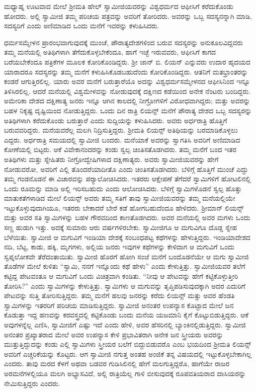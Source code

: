  ಮಧ್ಯಾಹ್ನ ಊಟವಾದ ಮೇಲೆ ಶ‍್ರೀಮತಿ ಹೇಲ್ ಸ್ವಾಮೀಜಿಯವರನ್ನು ವಿಶ್ವಧರ್ಮದ ಆಫೀಸಿಗೆ ಕರೆದುಕೊಂಡು ಹೋದರು. ಅಲ್ಲಿ ಸ್ವಾಮೀಜಿ ತಮ್ಮ ಪರಿಚಯ ಪತ್ರವನ್ನು ಅವರಿಗೆ ತೋರಿದರು. ಅವರನ್ನು ಒಬ್ಬ ಸದಸ್ಯನನ್ನಾಗಿ ಮಾಡಿ, ಸದಸ್ಯರಿಗೆ ಎಂದು ಅಣಿಮಾಡಿದ ಒಂದು ಮನೆಗೆ ಇವರನ್ನು ಕಳುಹಿಸಿದರು. 

 ಧರ್ಮಸಮ್ಮೇಳನ ಪ್ರಾರಂಭವಾಗುವುದಕ್ಕೆ ಮುಂಚೆ, ಪೌರಾತ್ಯದೇಶಗಳಿಂದ ಬರುವ ಸದಸ್ಯರನ್ನು ಅನುಕೂಲವಿದ್ದವರು ತಮ್ಮ ಮನೆಯಲ್ಲಿ ಅತಿಥಿಗಳಾಗಿ ತೆಗೆದುಕೊಳ್ಳಬೇಕೆಂದೂ, ಹಾಗೆ ಇಚ್ಛೆ ಇರುವವರು, ಆಫೀಸಿಗೆ ಕಾಗದ ಬರೆಯಬೇಕೆಂದೂ ಪತ್ರಿಕೆಗಳ ಮೂಲಕ ಕೋರಿಕೊಂಡಿದ್ದರು. ಶ‍್ರೀ ಜಾನ್ ಬಿ. ಲಿಯನ್ ಎನ್ನುವರು ಉದಾರ ಹೃದಯದ ಯಾರಾದರೂ ಸದಸ್ಯರನ್ನು ತಮ್ಮ ಮನೆಗೆ ಕಳುಹಿಸಿಕೊಡಬಹುದೆಂದು ಕೋರಿಕೊಂಡಿದ್ದರು. ಆತನಿಗೆ ಮತಭ್ರಾಂತರನ್ನು ಕಂಡರೆ ಆಗುತ್ತಿರಲಿಲ್ಲ. ಯಾರು ಅವರ ಮನೆಗೆ ಬರುತ್ತಾರೆಯೊ ಅದನ್ನು ವಿಶ್ವಧರ್ಮಸಮ್ಮೇಳನದ ಆಫೀಸಿನಿಂದ ಇನ್ನೂ ತಿಳಿಸಿರಲಿಲ್ಲ. ಆದರೆ ಮನೆಯಲ್ಲಿ ವಿಶ್ವಮೇಳವನ್ನು ನೋಡುವುದಕ್ಕೆ ದಕ್ಷಿಣದ ಕಡೆಯಿಂದ ಅನೇಕ ನೆಂಟರು ಬಂದಿದ್ದರು. ಅಮೇರಿಕಾ ದೇಶದ ದಕ್ಷಿಣಾತ್ಯ ಜನರು ಇನ್ನೂ ಆಗಿನ ಕಾಲದಲ್ಲಿ ನೀಗ್ರೋಗಳಿಗೆ ವಿರೋಧವಾಗಿದ್ದರು; ಮತ್ತು ಅವರನ್ನು ಬಹಳ ನಿಕೃಷ್ಟ ದೃಷ್ಟಿಯಿಂದ ನೋಡುತ್ತಿದ್ದರು. ಒಂದು ದಿನ ರಾತ್ರಿ ಲಿಯನ್ಸ್ ಮನೆಗೆ ಪೌರಾತ್ಯ ದೇಶದ ಒಬ್ಬ ಸದಸ್ಯರನ್ನು ಅತಿಥಿಗಳಾಗಿ ಕರೆದುಕೊಂಡು ಬರುತ್ತಾರೆ ಎಂದು ಸುದ್ದಿಯನ್ನು ಕಳುಹಿಸಿದರು. ಅವರು ಅರ್ಧರಾತ್ರಿ ಹೊತ್ತಿಗೆ ಬರುವವರಿದ್ದರು. ಮನೆಯವರೆಲ್ಲ ಮಲಗಿ ನಿದ್ರಿಸುತ್ತಿದ್ದರು. ಶ‍್ರೀಮತಿ ಲಿಯನ್ಸ್ ಅತಿಥಿಯನ್ನು ಬರಮಾಡಿಕೊಳ್ಳಲು ಎದ್ದರು. ಅರ್ಧರಾತ್ರಿ ಸಮಯದಲ್ಲಿ ಸ್ವಾಮೀಜಿ ಬಂದರು. ಮನೆಯಾಕೆ ಅವರನ್ನು ಸ್ವಾಗತಿಸಿ ಅವರಿಗೆ ಅಣಿಮಾಡಿದ ಕೋಣೆಯಲ್ಲಿ ಬಿಟ್ಟರು. ಆಕೆ ವಿವೇಕಾನಂದರನ್ನು ಕಂಡು ಸ್ವಲ್ಪ ಚಿಂತಿಸತೊಡಗಿದರು. ತಮ್ಮ ಮನೆಗೆ ಬಂದ ಇತರ ಅತಿಥಿಗಳು ಮತ್ತು ಸ್ನೇಹಿತರು ನೀಗ್ರೋದ್ವೇಷಿಗಳಾದ ದಕ್ಷಿಣಾತ್ಯರು. ಅವರು ಸ್ವಾಮೀಜಿಯವರನ್ನು ಹೇಗೆ ನೋಡುವರೋ, ಅವರಿಗೆ ಎಲ್ಲಿ ತೊಂದರೆಯಾದೀತೊ ಎಂದು ಚಿಂತಿಸತೊಡಗಿದರು. ಬೆಳಿಗ್ಗೆ ಹೊತ್ತಿಗೆ ಮುಂಚೆ ಎದ್ದು ತಮ್ಮ ಗಂಡನೊಡನೆ ಈ ವಿಚಾರವನ್ನು ಪರ‍್ಯಾಲೋಚಿಸಿದರು. ಇತರರು ಆಕ್ಷೇಪಣೆ ತೆಗೆದರೆ ಸ್ವಾಮಿಗಳಿಗೆ ಹೋಟಲಿನಲ್ಲಿ ಒಂದು ರೂಮನ್ನು ಮಾಡಿ ಅಲ್ಲಿ ಇರಿಸಬಹುದು ಎಂದು ಆಲೋಚಿಸಿದರು. ಬೆಳಿಗ್ಗೆ ಸ್ವಾಮಿಗಳೊಡನೆ ಸ್ವಲ್ಪ ಹೊತ್ತು ಮಾತುಕತೆಗಳಾಡಿದ ಮೇಲೆ ಲಿಯನ್ಸ್ ಅವರು ತಮ್ಮ ಸತಿಗೆ ತಾವು ಸ್ವಾಮೀಜಿಯವರನ್ನು ತಮ್ಮ ಮನೆಯಲ್ಲಿಯೇ ಇಟ್ಟುಕೊಳ್ಳುವುದಾಗಿಯೂ, ಇತರರು ಬೇಕಾದರೆ ಬೇರೆ ಕಡೆ ಹೋಗಬಹುದೆಂದೂ ಹೇಳಿದರು. ಶ‍್ರೀಮಾನ್ ಲಿಯನ್ಸ್ ಮತ್ತು ಅವರ ಸತಿ ಸ್ವಾಮಿಗಳನ್ನು ಬಹಳ ಗೌರವದಿಂದ ಕಾಣತೊಡಗಿದರು. ಅವರ ಮನೆಯಲ್ಲಿ ಅವರ ಮಗಳು ಒಂದು ಸಣ್ಣ ಹುಡುಗಿ ಇತ್ತು. ಅದಕ್ಕೆ ಸುಮಾರು ಆರು ವರ್ಷಗಳಿರಬೇಕು. ಸ್ವಾಮೀಜಿಗೂ ಆ ಮಗುವಿಗೂ ದೊಡ್ಡ ಸ್ನೇಹ ಬೆಳೆಯಿತು. ಸ್ವಾಮೀಜಿ ಆ ಮಗುವಿಗೆ ಇಂಡಿಯಾ ದೇಶಕ್ಕೆ ಸಂಬಂಧಪಟ್ಟ ಕಥೆಗಳನ್ನು ಹೇಳುತ್ತಿದ್ದರು. ಇಂಡಿಯಾದೇಶದ ನದಿ, ಬೆಟ್ಟ, ಕಾಡು, ಹಕ್ಕಿ, ಮೃಗಗಳು, ಅಲ್ಲಿಯ ಜನರು ಇವುಗಳ ಕಥೆಗಳನ್ನು ಕೇಳಿದಾಗ ಆ ಮಗುವಿಗೆ ಒಂದು ಸ್ವಪ್ನಲೋಕವೇ ತೆರೆದಂತಾಯಿತು. ಸ್ವಾಮೀಜಿ ಹೊರಗೆ ಹೋಗಿ ಸಂಜೆ ಮನೆಗೆ ಬಂದೊಡನೆಯೇ ಆ ಮಗು ಸ್ವಾಮೀಜಿ ತೊಡೆಗಳ ಮೇಲೆ ಕುಳಿತು “ಸ್ವಾಮಿ, ನನಗೆ ಇನ್ನೊಂದು ಕಥೆ ಹೇಳು” ಎಂದು ಕೇಳುತ್ತಿತ್ತು. ಸ್ವಾಮೀಜಿಯವರ ತಲೆಗೆ ಕಟ್ಟಿದ್ದ ಪೇಟವಂತೂ ಆ ಮಗುವಿಗೆ ಒಂದು ವಿಚಿತ್ರವಾಗಿ ಕಂಡಿತು. “ನೀವು ಆ ಪೇಟವನ್ನು ಹೇಗೆ ಕಟ್ಟಿಕೊಳ್ಳುತ್ತೀರಿ ತೋರಿಸಿ?” ಎಂದು ಸ್ವಾಮಿಗಳನ್ನು ಕೇಳುತ್ತಿತ್ತು. ಸ್ವಾಮಿಗಳು ಆ ಮಗುವನ್ನು ತೃಪ್ತಿಪಡಿಸುವುದಕ್ಕಾಗಿ ಅದರ ಎದುರಿಗೆ ಪೇಟವನ್ನು ಸುತ್ತಿ ತೋರಿಸುತ್ತಿದ್ದರು. ತಮ್ಮ ಮನೆಗೆ ಹಲವು ಜನರನ್ನು ಕರೆದು ಲಿಯನ್ಸ್ ಮತ್ತು ಅವರ ಹೆಂಡತಿ ಸ್ವಾಮಿಗಳನ್ನು ಇತರರಿಗೆ ಪರಿಚಯ ಮಾಡಿಸುತ್ತಿದ್ದರು. ಸ್ವಾಮೀಜಿ ಅನಂತರ ಉಪನ್ಯಾಸ ಕೊಟ್ಟಾದ ಮೇಲೆ ಜನ ಕೊಡುತ್ತಾ ಇದ್ದ ಹಣವನ್ನು ಕರವಸ್ತ್ರದಲ್ಲಿ ಕಟ್ಟಿಕೊಂಡು ಬಂದು ಮನೆಯ ಯಜಮಾನಿ ಕೈಗೆ ಕೊಟ್ಟುಬಿಡುತ್ತಿದ್ದರು. ಆಕೆ ಅವುಗಳನ್ನೆಲ್ಲ ಎಣಿಸಿ, ಸ್ವಾಮೀಜಿಗೆ ಎಷ್ಟು ಇದೆ ಎಂದು ಹೇಳಿ, ಅವರ ಹೆಸರಿನಲ್ಲಿ ಬ್ಯಾಂಕಿನಲ್ಲಿಡುತ್ತಿದ್ದರು. ಸ್ವಾಮೀಜಿ ಅನಂತರ ಪ್ರಖ್ಯಾತರಾದ ಮೇಲೆ ಅವರ ಉಪನ್ಯಾಸ ಕೇಳಿ ಪ್ರಭಾವಿತರಾಗಿ ಅನೇಕ ಜನ ಸ್ತ್ರೀಯರು ಅವರನ್ನು ಮುತ್ತುತ್ತಿದ್ದುದನ್ನು ಕಂಡು ಎಲ್ಲಿ ಸ್ವಾಮಿಗಳು ಸ್ತ್ರೀಯರ ಬಲೆಗೆ ಬಿದ್ದುಬಿಡುವರೊ ಎಂಬ ಭಯದಿಂದ ಶ‍್ರೀಮತಿ ಲಿಯನ್ಸ್ ಅವರಿಗೆ ಎಚ್ಚರಿಕೆಯನ್ನು ಕೊಟ್ಟರು. ಆಗ ಸ್ವಾಮೀಜಿ ನಗುತ್ತ ಅಂತಹ ಅಂಜಿಕೆ ತನ್ನ ವಿಷಯದಲ್ಲಿ ಇಟ್ಟುಕೊಳ್ಳಬೇಕಾಗಿಲ್ಲ ಎಂದರು. ತಾವು ಮರದ ಕೆಳಗೆ ಅಥವಾ ಬಡವರ ಗುಡಿಸಿಲಿನಲ್ಲಿ ಹೇಗೆ ಮಲಗುತ್ತಿದ್ದರೊ, ಹಾಗೆಯೇ ರಾಜರ ಅರಮನೆಗಳಲ್ಲಿಯೂ ಮಲಗಿ ಅಭ್ಯಾಸವಿದೆ, ಅಲ್ಲಿ ರಾತ್ರಿಯೆಲ್ಲ ಗಾಳಿ ಬೀಸುವುದಕ್ಕೆ ರೂಪವತಿಯರಾದ ದಾಸಿಯರನ್ನು ನೇಮಿಸುತ್ತಿದ್ದರು ಎಂದರು. 


